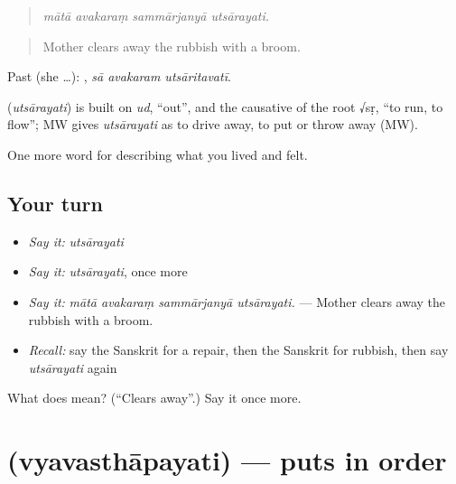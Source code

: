 \begin{quote}
   
\end{quote}

\begin{quote}
\emph{mātā avakaraṃ sammārjanyā utsārayati.}
\end{quote}

\begin{quote}
Mother clears away the rubbish with a broom.
\end{quote}

Past (she …):   , \emph{sā avakaram utsāritavatī}.

\begin{cousinweb}
\textbf{} (\emph{utsārayati}) is built on \emph{ud}, \textquotedblleft{}out\textquotedblright{}, and the causative of the root √sṛ, \textquotedblleft{}to run, to flow\textquotedblright{}; MW gives \emph{utsārayati} as to drive away, to put or throw away (MW).
\end{cousinweb}

\begin{grammarlens}[title={What you've built}]
One more word for describing what you lived and felt.
\end{grammarlens}

\subsection*{Your turn}
\begin{itemize}
\raggedright
  \item \emph{Say it:} \emph{utsārayati}
  \item \emph{Say it:} \emph{utsārayati}, once more
  \item \emph{Say it:} \emph{mātā avakaraṃ sammārjanyā utsārayati.} — Mother clears away the rubbish with a broom.
  \item \emph{Recall:} say the Sanskrit for a repair, then the Sanskrit for rubbish, then say \emph{utsārayati} again
\end{itemize}

\begin{tcolorbox}[breakable,colback=teal!4,colframe=teal!35!black,title={Before you move on}]
What does  mean? (\textquotedblleft{}Clears away\textquotedblright{}.) Say it once more.
\end{tcolorbox}
\section[\texorpdfstring{\sk{व्यवस्थापयति} (vyavasthāpayati)}{व्यवस्थापयति (vyavasthāpayati)}]{ (vyavasthāpayati) — puts in order}

